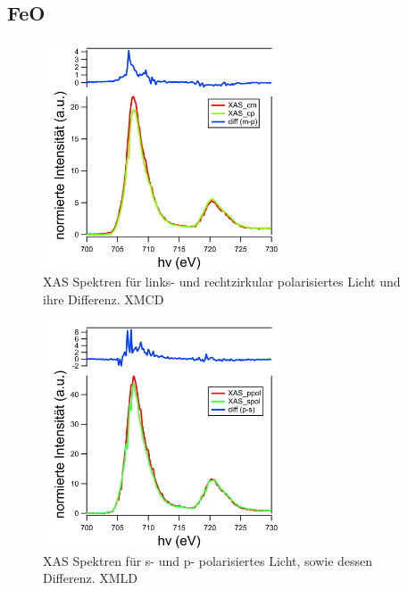         \subsection{FeO}
            \begin{figure}
                \centering
                \includegraphics[width=0.65\textwidth]{./content/pictures/FeO/XMCD_FeO.png}
                \caption{XAS Spektren für links- und rechtzirkular polarisiertes Licht und ihre Differenz. XMCD}
                \label{fig:XMCD}
            \end{figure}
            \begin{figure}
                \centering
                \includegraphics[width=0.65\textwidth]{./content/pictures/FeO/XMLD_FeO.png}
                \caption{XAS Spektren für s- und p- polarisiertes Licht, sowie dessen Differenz. XMLD}
                \label{fig:XMLD}
            \end{figure}
